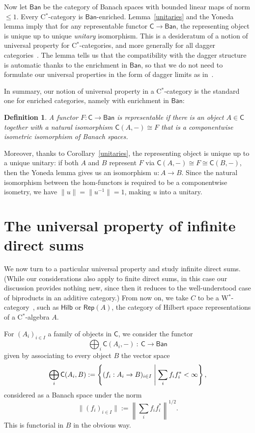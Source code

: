 \documentclass[reqno,T1]{amsproc}
\newcommand{\cat}[1]{\mathsf{#1}}		%
\newcommand{\Ban}{\mathsf{Ban}}			%
\newcommand{\Hilb}{\mathsf{Hilb}} 		%
\newcommand{\Rep}[1]{\mathsf{Rep}(#1)}		%
\theoremstyle{plain}
\newtheorem{defn}[thm]{Definition}
\theoremstyle{remark}
\numberwithin{equation}{section}
\begin{document}
Now let $\Ban$ be the category of Banach spaces with bounded linear maps of norm $\leq 1$. Every C$^*$-category is $\Ban$-enriched. Lemma~\ref{unitaries} and the Yoneda lemma imply that for any representable functor $\cat{C} \to \Ban$, the representing object is unique up to unique \emph{unitary} isomorphism. This is a desideratum of a notion of universal property for C$^*$-categories, and more generally for all dagger categories~\cite{daglims}. The lemma tells us that the compatibility with the dagger structure is automatic thanks to the enrichment in $\Ban$, so that we do not need to formulate our universal properties in the form of dagger limits as in~\cite{daglims}.

In summary, our notion of universal property in a C$^*$-category is the standard one for enriched categories, namely with enrichment in $\Ban$:

\begin{defn}
A functor $F : \cat{C} \to \Ban$ is \emph{representable} if there is an object $A \in \cat{C}$ together with a natural isomorphism $\cat{C}(A,-)\cong F$ that is a componentwise isometric isomorphism of Banach spaces.
\end{defn}

Moreover, thanks to Corollary~\ref{unitaries}, the representing object is unique up to a unique unitary: if both $A$ and $B$ represent $F$ via $\cat{C}(A,-)\cong F\cong \cat{C}(B,-)$, then the Yoneda lemma gives us an isomorphism $u : A \to B$. Since the natural isomorphism between the hom-functors is required to be a componentwise isometry, we have $\| u \| = \| u^{-1} \| = 1$, making $u$ into a unitary.

\section{The universal property of infinite direct sums}

We now turn to a particular universal property and study infinite direct sums. (While our considerations also apply to finite direct sums, in this case our discussion provides nothing new, since then it reduces to the well-understood case of biproducts in an additive category.) From now on, we take $C$ to be a W$^*$-category~\cite{wstarcat}, such as $\Hilb$ or $\Rep{A}$, the category of Hilbert space representations of a C$^*$-algebra $A$.

For $(A_i)_{i\in I}$ a family of objects in $\cat{C}$, we consider the functor
\[
	\bigoplus_i \cat{C}(A_i,-) \: : \: \cat{C} \to \Ban
\]
given by associating to every object $B$ the vector space
\[
	\bigoplus_i \cat{C}(A_i , B) := \left\{ (f_i : A_i \to B)_{i\in I} \Biggm\vert \sum_i f_i f_i^* < \infty \right\},
\]
considered as a Banach space under the norm
\[
	\| (f_i)_{i \in I} \| := \left\| \sum_i f_i f_i^* \right\|^{1/2}.
\]
This is functorial in $B$ in the obvious way.
\end{document}
